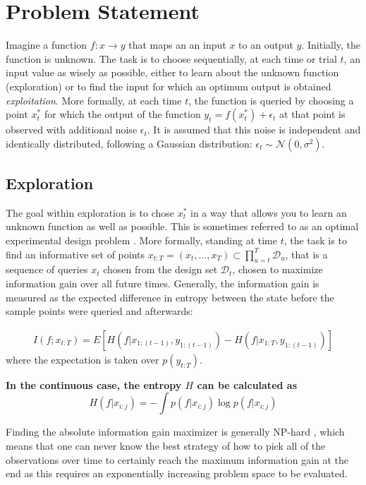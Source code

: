 \documentclass[authoryear,11pt,review]{elsarticle}
\newcommand{\fixme}[1]{\textbf{#1}}
\begin{document}
\section{Problem Statement}
Imagine a function $f: x \rightarrow y$ that maps an an input $x$ to an output $y$. Initially, the function is unknown. The task is to choose sequentially, at each time or trial $t$, an input value as wisely as possible, either to learn about the unknown function (exploration) or to find the input for which an optimum output is obtained \emph{exploitation}. More formally, at each time $t$, the function is queried by choosing a point $x^*_t$ for which the output of the function $y_t=f(x^*_t)+\epsilon_t$ at that point is observed with additional noise $\epsilon_t$. It is assumed that this noise is independent and identically distributed, following a Gaussian distribution: $\epsilon_t \sim \mathcal{N}(0,\sigma^2)$.

\subsection{Exploration}
The goal within exploration is to chose $x^*_t$ in a way that allows you to learn an unknown function as well as possible. This is sometimes referred to as an optimal experimental design problem \citep{goos2011optimal}. More formally, standing at time $t$, the task is to find an informative set of points $x_{t:T} = (x_t,\ldots,x_T) \subset \prod_{u=t}^T \mathcal{D}_u$, that is a sequence of queries $x_t$ chosen from the design set $\mathcal{D}_t$, chosen to maximize information gain over all future times. Generally, the information gain is measured as the expected difference in entropy between the state before the sample points were queried and afterwards:%

\begin{align}
\label{eq:infogain1}
I(f;x_{t:T})=E[H(f|x_{1:(t-1)},y_{1:(t-1)})-H(f|x_{1:T},y_{1:(t-1)})]
\end{align}
where the expectation is taken over $p(y_{t:T})$. 

\fixme{In the continuous case, the entropy $H$ can be calculated as%
\begin{equation*}
\label{eq:entdis}
H(f|x_{i:j})= - \int p(f|x_{i:j}) \log p(f|x_{i:j}) %
\end{equation*}
}

Finding the absolute information gain maximizer is generally NP-hard \citep{ko1995exact}, which means that one can never know the best strategy of how to pick all of the observations over time to certainly reach the maximum information gain at the end as this requires an exponentially increasing problem space to be evaluated. 
\end{document}
